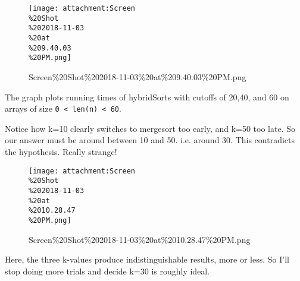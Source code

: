 \documentclass[11pt]{article}
\makeatletter
\def\maxwidth{\ifdim\Gin@nat@width>\linewidth\linewidth
    \else\Gin@nat@width\fi}
\let\Oldincludegraphics\includegraphics
\renewcommand{\includegraphics}[1]{\Oldincludegraphics[width=.8\maxwidth]{#1}}
\makeatother
\begin{document}
    \begin{figure}
\centering
\texttt{[image: attachment:Screen\\\%20Shot\\\%202018-11-03\\\%20at\\\%209.40.03\\\%20PM.png]}
\caption{Screen\%20Shot\%202018-11-03\%20at\%209.40.03\%20PM.png}
\end{figure}

The graph plots running times of hybridSorts with cutoffs of 20,40, and
60 on arrays of size \texttt{0\ \textless{}\ len(n)\ \textless{}\ 60}.

Notice how k=10 clearly switches to mergesort too early, and k=50 too
late. So our answer must be around between 10 and 50. i.e. around 30.
This contradicts the hypothesis. Really strange!

    \begin{figure}
\centering
\texttt{[image: attachment:Screen\\\%20Shot\\\%202018-11-03\\\%20at\\\%2010.28.47\\\%20PM.png]}
\caption{Screen\%20Shot\%202018-11-03\%20at\%2010.28.47\%20PM.png}
\end{figure}

Here, the three k-values produce indistinguishable results, more or
less. So I'll stop doing more trials and decide k=30 is roughly ideal.
\end{document}
